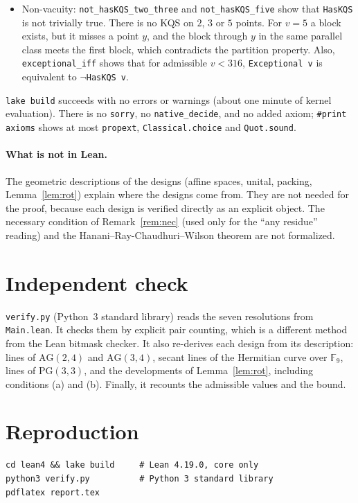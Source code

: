 \documentclass[11pt]{article}
\theoremstyle{definition}
\theoremstyle{remark}
\begin{document}
\begin{itemize}
\texttt{conjecture\_00000001028\_false : }$\neg$\texttt{Conjecture}.
\texttt{exceptionalLe\_le\_20} and \texttt{clause2\_le\_false} handle the non-strict reading.
\texttt{admissible\_below\_316} lists the $26$ admissible values below $316$.
\item Non-vacuity: \texttt{not\_hasKQS\_two\_three} and \texttt{not\_hasKQS\_five} show that
\texttt{HasKQS} is not trivially true. There is no KQS on $2$, $3$ or $5$ points. For $v=5$ a
block exists, but it misses a point $y$, and the block through $y$ in the same parallel class
meets the first block, which contradicts the partition property. Also, \texttt{exceptional\_iff} shows that for
admissible $v<316$, \texttt{Exceptional v} is equivalent to $\neg$\texttt{HasKQS v}.
\end{itemize}
\texttt{lake build} succeeds with no errors or warnings (about one minute of kernel
evaluation). There is no \texttt{sorry}, no \texttt{native\_decide}, and no added axiom;
\texttt{\#print axioms} shows at most \texttt{propext}, \texttt{Classical.choice} and
\texttt{Quot.sound}.

\paragraph{What is not in Lean.} The geometric descriptions of the designs (affine spaces,
unital, packing, Lemma~\ref{lem:rot}) explain where the designs come from. They are not needed
for the proof, because each design is verified directly as an explicit object. The necessary
condition of Remark~\ref{rem:nec} (used only for the ``any residue'' reading) and the
Hanani--Ray-Chaudhuri--Wilson theorem are not formalized.

\section{Independent check}
\texttt{verify.py} (Python~3 standard library) reads the seven resolutions from
\texttt{Main.lean}. It checks them by explicit pair counting, which is a different method from the Lean
bitmask checker. It also re-derives each design from its description: lines of
$\mathrm{AG}(2,4)$ and $\mathrm{AG}(3,4)$, secant lines of the Hermitian curve over
$\mathbb F_9$, lines of $\mathrm{PG}(3,3)$, and the developments of Lemma~\ref{lem:rot},
including conditions (a) and (b). Finally, it recounts the admissible values and the bound.

\section{Reproduction}
\begin{verbatim}
cd lean4 && lake build     # Lean 4.19.0, core only
python3 verify.py          # Python 3 standard library
pdflatex report.tex
\end{verbatim}
\end{document}
